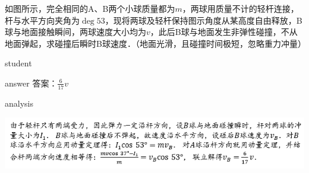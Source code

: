  
 \begin{example}
 	如图所示，完全相同的A、B两个小球质量都为$ m $，两球用质量不计的轻杆连接，杆与水平方向夹角为$ \deg{53} $，现将两球及轻杆保持图示角度从某高度自由释放，B球与地面接触瞬间，两球速度大小均为$ v $，此后B球与地面发生非弹性碰撞，不从地面弹起，求碰撞后瞬时B球速度．（地面光滑，且碰撞时间极短，忽略重力冲量）
 	
 	\begin{taggedblock}{student}
 		\vspace*{2cm}
 	\end{taggedblock}
 	
 	
 	\begin{taggedblock}{answer}
 		答案：$\frac{6}{17}v$
 	\end{taggedblock}
 	
 	
 	\begin{taggedblock}{analysis}
 	\begin{center}
\includegraphics[width=0.9\linewidth]{image/momentum-11}
\end{center}

 	\end{taggedblock}
 \end{example}
 
